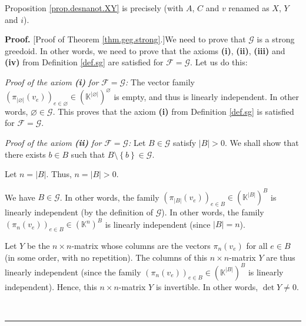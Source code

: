 \documentclass[numbers=enddot,12pt,final,onecolumn,notitlepage]{scrartcl}%
\theoremstyle{definition}
\newenvironment{proof}[1][Proof]{\noindent\textbf{#1.} }{\ \rule{0.5em}{0.5em}}
\theoremstyle{plainsl}
\begin{document}
Proposition \ref{prop.desnanot.XY} is precisely \cite[Proposition
6.137]{detnotes} (with $A$, $C$ and $v$ renamed as $X$, $Y$ and $i$).

\begin{proof}
[Proof of Theorem \ref{thm.geg.strong}.]We need to prove that $\mathcal{G}$ is
a strong greedoid. In other words, we need to prove that the axioms
\textbf{(i)}, \textbf{(ii)}, \textbf{(iii)} and \textbf{(iv)} from Definition
\ref{def.sg} are satisfied for $\mathcal{F}=\mathcal{G}$. Let us do this:
\medskip

\textit{Proof of the axiom \textbf{(i)} for }$\mathcal{F}=\mathcal{G}%
$\textit{:} The vector family $\left(  \pi_{\left\vert \varnothing\right\vert
}\left(  v_{e}\right)  \right)  _{e\in\varnothing}\in\left(  \mathbb{K}%
^{\left\vert \varnothing\right\vert }\right)  ^{\varnothing}$ is empty, and
thus is linearly independent. In other words, $\varnothing\in\mathcal{G}$.
This proves that the axiom \textbf{(i)} from Definition \ref{def.sg} is
satisfied for $\mathcal{F}=\mathcal{G}$. \medskip

\textit{Proof of the axiom \textbf{(ii)} for }$\mathcal{F}=\mathcal{G}%
$\textit{:} Let $B\in\mathcal{G}$ satisfy $\left\vert B\right\vert >0$. We
shall show that there exists $b\in B$ such that $B\setminus\left\{  b\right\}
\in\mathcal{G}$.

Let $n=\left\vert B\right\vert $. Thus, $n=\left\vert B\right\vert >0$.

We have $B\in\mathcal{G}$. In other words, the family $\left(  \pi_{\left\vert
B\right\vert }\left(  v_{e}\right)  \right)  _{e\in B}\in\left(
\mathbb{K}^{\left\vert B\right\vert }\right)  ^{B}$ is linearly independent
(by the definition of $\mathcal{G}$). In other words, the family $\left(
\pi_{n}\left(  v_{e}\right)  \right)  _{e\in B}\in\left(  \mathbb{K}%
^{n}\right)  ^{B}$ is linearly independent (since $\left\vert B\right\vert =n$).

Let $Y$ be the $n\times n$-matrix whose columns are the vectors $\pi
_{n}\left(  v_{e}\right)  $ for all $e\in B$ (in some order, with no
repetition). The columns of this $n\times n$-matrix $Y$ are thus linearly
independent (since the family $\left(  \pi_{n}\left(  v_{e}\right)  \right)
_{e\in B}\in\left(  \mathbb{K}^{\left\vert B\right\vert }\right)  ^{B}$ is
linearly independent). Hence, this $n\times n$-matrix $Y$ is invertible. In
other words, $\det Y\neq0$.


\end{proof}
\end{document}
